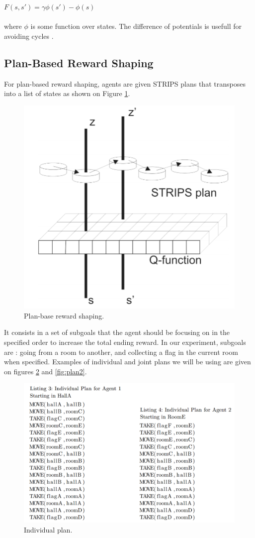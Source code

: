 \documentclass[letterpaper]{article}
\begin{document}
$F(s, s') =\gamma \phi (s') - \phi (s)$\\\\
where $\phi$ is some function over states. The difference of potentials is usefull for avoiding cycles  \citep{rs2}.

\subsection{Plan-Based Reward Shaping}

For plan-based reward shaping, agents are given STRIPS plans that transposes into a list of states as shown on  Figure \ref{fig:strips}.

\begin{figure}[h!]
\centering
  \includegraphics[width=0.75\linewidth]{img/strips.png}
  \caption{Plan-base reward shaping.}
  \label{fig:strips}
\end{figure}


It consists in a set of subgoals that the agent should be focusing on in the specified order to increase the total ending reward. In our experiment, subgoals are : going from a room to another, and collecting a flag in the current room when specified. Examples of individual and joint plans we will be using are given on figures \ref{fig:plan1} and \ref{fig:plan2}.

\begin{figure}[h!]
\centering
  \includegraphics[width=0.85\linewidth]{img/individualPlan.png}
  \caption{Individual plan.}
  \label{fig:plan1}
\end{figure}
\end{document}
